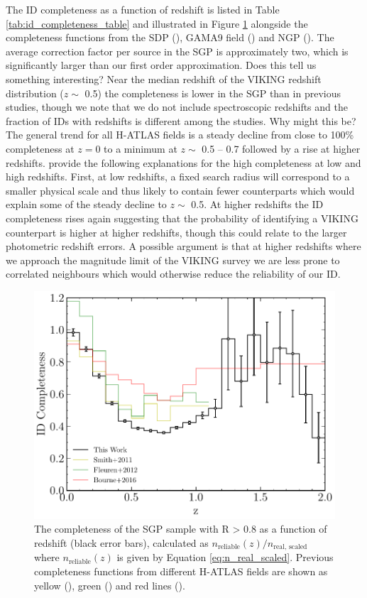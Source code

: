The ID completeness as a function of redshift is listed in Table \ref{tab:id_completeness_table} and illustrated in Figure \ref{fig:id_completeness} alongside the completeness functions from the SDP (\citealt{Smith_2011}), GAMA9 field (\citealt{Fleuren_2012}) and NGP (\citealt{Bourne_2016}). The average correction factor per source in the SGP is approximately two, which is significantly larger than our first order approximation. {\color{red} Does this tell us something interesting?}  Near the median redshift of the VIKING redshift distribution ($z \sim$ 0.5) the completeness is lower in the SGP than in previous studies, though we note that we do not include spectroscopic redshifts and the fraction of IDs with redshifts is different among the studies. {\color{red} Why might this be?} The general trend for all H-ATLAS fields is a steady decline from close to 100\% completeness at $z = 0$ to a minimum at $z \sim$ 0.5 -- 0.7 followed by a rise at higher redshifts. \citealt{Bourne_2016} provide the following explanations for the high completeness at low and high redshifts. First, at low redshifts, a fixed search radius will correspond to a smaller physical scale and thus likely to contain fewer counterparts which would explain some of the steady decline to $z \sim$ 0.5. At higher redshifts the ID completeness rises again suggesting that the probability of identifying a VIKING counterpart is higher at higher redshifts, though this could relate to the larger photometric redshift errors. A possible argument is that at higher redshifts where we approach the magnitude limit of the VIKING survey we are less prone to correlated neighbours which would otherwise reduce the reliability of our ID.

\begin{figure}
	\centering
	\includegraphics[width=0.75\columnwidth]{Figures/id_completeness.pdf}
	\caption{The completeness of the SGP sample with R > 0.8 as a function of redshift (black error bars), calculated as $n_{\textrm{reliable}}(z)/n_{\textrm{real, scaled}}$ where $n_{\textrm{reliable}}(z)$ is given by Equation \ref{eq:n_real_scaled}. Previous completeness functions from different H-ATLAS fields are shown as yellow (\citealt{Smith_2011}), green (\citealt{Fleuren_2012}) and red lines (\citealt{Bourne_2016}).}
	\label{fig:id_completeness}
\end{figure}

